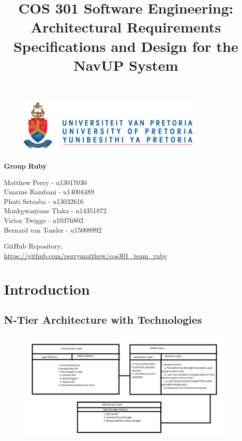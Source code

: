 \documentclass{article}
\begin{document}
		\begin{figure}[t]
			\centering
			\includegraphics[width=350px]{UP_Logo.PNG}
		\end{figure}
			\title{COS 301 Software Engineering: Architectural Requirements Specifications and Design for the NavUP System}
\maketitle
		\begin{center}
			\textbf{\newline Group Ruby} \\
		\end{center}
			
				
		\begin{flushright} \large
			Matthew Perry - u13017030\\
			Unarine Rambani - u14004489\\
			Phuti Setoaba -  u13032616\\
			Mankgwanyane Tlaka - u14351872\\
			Victor Twigge -  u10376802\\
			Bernard van Tonder - u15008992\\
		\end{flushright}
		
		
		
		
		GitHub Repository: \href{https://github.com/perrymatthew/cos301_team_ruby}\\
		\url{https://github.com/perrymatthew/cos301_team_ruby}
	

\clearpage
\tableofcontents
\clearpage
\section{Introduction}
	
	\subsection{N-Tier Architecture with Technologies}
		\begin{figure}[H]
			\includegraphics[width=150mm]{Introduction/N-Tier_with_Technologies.png}
		\end{figure}
\end{document}
